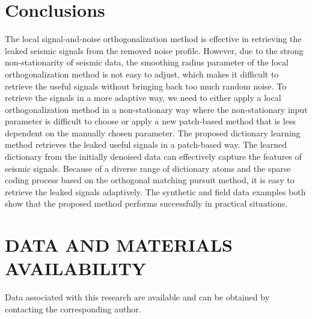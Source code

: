 \section{Conclusions}
The local signal-and-noise orthogonalization method is effective in retrieving the leaked seismic signals from the removed noise profile. However, due to the strong non-stationarity of seismic data, the smoothing radius parameter of the local orthogonalization method is not easy to adjust, which makes it difficult to retrieve the useful signals without bringing back too much random noise. To retrieve the signals in a more adaptive way, we need to either apply a local orthogonalization method in a non-stationary way where the non-stationary input parameter is difficult to choose or apply a new patch-based method that is less dependent on the manually chosen parameter. The proposed dictionary learning method retrieves the leaked useful signals in a patch-based way. The learned dictionary from the initially denoised data can effectively capture the features of seismic signals. Because of a diverse range of dictionary atoms and the sparse coding process based on the orthogonal matching pursuit method, it is easy to retrieve the leaked signals adaptively. The synthetic and field data examples both show that the proposed method performs successfully in practical situations. 

\section{DATA AND MATERIALS AVAILABILITY}
Data associated with this research are available and can be obtained by contacting the corresponding author.







